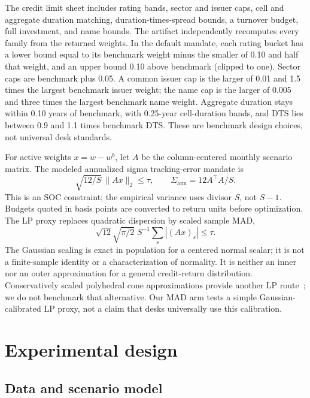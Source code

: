\documentclass[11pt,a4paper]{article}
\begin{document}
The credit limit sheet includes rating bands, sector and issuer
caps, cell and aggregate duration matching, duration-times-spread bounds, a
turnover budget, full investment, and name bounds. The artifact independently
recomputes every family from the returned weights. In the default mandate,
each rating bucket has a lower bound equal to its benchmark weight minus the
smaller of 0.10 and half that weight, and an upper bound 0.10 above benchmark
(clipped to one). Sector caps are benchmark plus 0.05. A common issuer cap is
the larger of 0.01 and 1.5 times the largest benchmark issuer weight; the name
cap is the larger of 0.005 and three times the largest benchmark name weight.
Aggregate duration stays within 0.10 years of benchmark, with 0.25-year
cell-duration bands, and DTS lies between 0.9 and 1.1 times benchmark DTS.
These are benchmark design choices, not universal desk standards.

For active weights $x=w-w^b$, let $A$ be the column-centered monthly scenario
matrix. The modeled annualized sigma tracking-error mandate is
\begin{equation}
  \sqrt{12/S}\,\lVert Ax\rVert_2\leq \tau,
  \qquad \Sigma_{\mathrm{ann}}=12A^\top A/S.
\end{equation}
This is an SOC constraint; the empirical variance uses divisor $S$, not
$S-1$. Budgets quoted in basis points are converted to return units before
optimization. The LP proxy replaces
quadratic dispersion by scaled sample MAD,
\begin{equation}
 \sqrt{12}\sqrt{\pi/2}\;S^{-1}\sum_s |(Ax)_s|\leq\tau.
\end{equation}
The Gaussian scaling is exact in population for a centered normal scalar;
it is not a finite-sample identity or a characterization of normality. It is neither
an inner nor an outer approximation for a general credit-return distribution.
Conservatively scaled polyhedral cone approximations provide another LP
route~\citep{bental2001soc}; we do not benchmark that alternative. Our MAD arm
tests a simple Gaussian-calibrated LP proxy, not a claim that desks universally
use this calibration.

\section{Experimental design}

\subsection{Data and scenario model}
\end{document}
